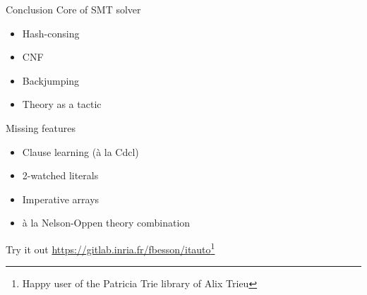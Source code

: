 \documentclass{beamer}
\begin{document}
\begin{frame}{Conclusion}
  Core of SMT solver
  \begin{itemize}
  \item Hash-consing
  \item CNF
  \item Backjumping
  \item Theory as a tactic
  \end{itemize}
  Missing features
  \begin{itemize}
  \item Clause learning (à la Cdcl)
  \item 2-watched literals 
  \item Imperative arrays
  \item à la Nelson-Oppen theory combination
  \end{itemize}
  \bigskip
  Try it out \url{https://gitlab.inria.fr/fbesson/itauto}\footnote{Happy user of the Patricia Trie library of Alix Trieu}
  
\end{frame}





\end{document}
